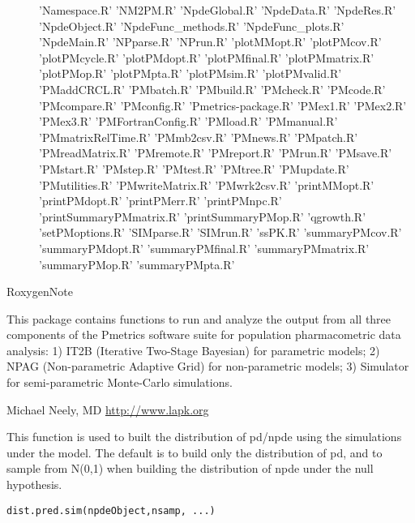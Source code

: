 \documentclass[a4paper]{book}
\begin{document}
\begin{description}
{'Namespace.R' 'NM2PM.R' 'NpdeGlobal.R' 'NpdeData.R' 'NpdeRes.R'
'NpdeObject.R' 'NpdeFunc\_methods.R' 'NpdeFunc\_plots.R'
'NpdeMain.R' 'NPparse.R' 'NPrun.R' 'plotMMopt.R' 'plotPMcov.R'
'plotPMcycle.R' 'plotPMdopt.R' 'plotPMfinal.R' 'plotPMmatrix.R'
'plotPMop.R' 'plotPMpta.R' 'plotPMsim.R' 'plotPMvalid.R'
'PMaddCRCL.R' 'PMbatch.R' 'PMbuild.R' 'PMcheck.R' 'PMcode.R'
'PMcompare.R' 'PMconfig.R' 'Pmetrics-package.R' 'PMex1.R'
'PMex2.R' 'PMex3.R' 'PMFortranConfig.R' 'PMload.R' 'PMmanual.R'
'PMmatrixRelTime.R' 'PMmb2csv.R' 'PMnews.R' 'PMpatch.R'
'PMreadMatrix.R' 'PMremote.R' 'PMreport.R' 'PMrun.R' 'PMsave.R'
'PMstart.R' 'PMstep.R' 'PMtest.R' 'PMtree.R' 'PMupdate.R'
'PMutilities.R' 'PMwriteMatrix.R' 'PMwrk2csv.R' 'printMMopt.R'
'printPMdopt.R' 'printPMerr.R' 'printPMnpc.R'
'printSummaryPMmatrix.R' 'printSummaryPMop.R' 'qgrowth.R'
'setPMoptions.R' 'SIMparse.R' 'SIMrun.R' 'ssPK.R'
'summaryPMcov.R' 'summaryPMdopt.R' 'summaryPMfinal.R'
'summaryPMmatrix.R' 'summaryPMop.R' 'summaryPMpta.R'}
\item[RoxygenNote]
\end{description}
%
\begin{Description}\relax
This package contains functions to run and analyze the output from all three components
of the Pmetrics software suite for population pharmacometric data analysis:
1) IT2B (Iterative Two-Stage Bayesian) for parametric models; 2) NPAG (Non-parametric
Adaptive Grid) for non-parametric models; 3) Simulator for semi-parametric Monte-Carlo
simulations.
\end{Description}
%
\begin{Author}\relax
Michael Neely, MD
\url{http://www.lapk.org}
\end{Author}
%
\begin{Description}\relax
This function is used to built the distribution of pd/npde using the simulations under the model. The default is to build only the distribution of pd, and to sample from N(0,1) when building the distribution of npde under the null hypothesis.
\end{Description}
%
\begin{Usage}
\begin{verbatim}
dist.pred.sim(npdeObject,nsamp, ...)
\end{verbatim}
\end{Usage}
\end{document}
